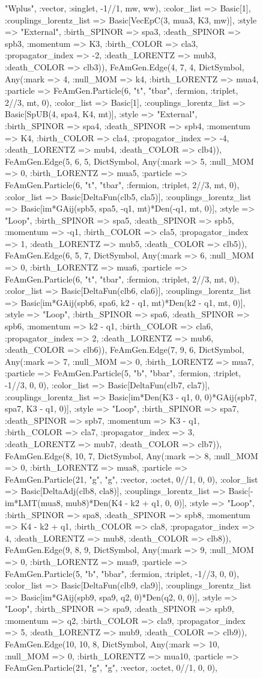 \documentclass{revtex4}
\begin{document}
\begin{figure}[!htb]
\begin{center}
{"Wplus", :vector, :singlet, -1//1, mw, ww), :color_list => Basic[1], :couplings_lorentz_list => Basic[VecEpC(3, mua3, K3, mw)], :style => "External", :birth_SPINOR => spa3, :death_SPINOR => spb3, :momentum => K3, :birth_COLOR => cla3, :propagator_index => -2, :death_LORENTZ => mub3, :death_COLOR => clb3)), FeAmGen.Edge(4, 7, 4, Dict{Symbol, Any}(:mark => 4, :null_MOM => k4, :birth_LORENTZ => mua4, :particle => FeAmGen.Particle(6, "t", "tbar", :fermion, :triplet, 2//3, mt, 0), :color_list => Basic[1], :couplings_lorentz_list => Basic[SpUB(4, spa4, K4, mt)], :style => "External", :birth_SPINOR => spa4, :death_SPINOR => spb4, :momentum => K4, :birth_COLOR => cla4, :propagator_index => -4, :death_LORENTZ => mub4, :death_COLOR => clb4)), FeAmGen.Edge(5, 6, 5, Dict{Symbol, Any}(:mark => 5, :null_MOM => 0, :birth_LORENTZ => mua5, :particle => FeAmGen.Particle(6, "t", "tbar", :fermion, :triplet, 2//3, mt, 0), :color_list => Basic[DeltaFun(clb5, cla5)], :couplings_lorentz_list => Basic[im*GAij(spb5, spa5, -q1, mt)*Den(-q1, mt, 0)], :style => "Loop", :birth_SPINOR => spa5, :death_SPINOR => spb5, :momentum => -q1, :birth_COLOR => cla5, :propagator_index => 1, :death_LORENTZ => mub5, :death_COLOR => clb5)), FeAmGen.Edge(6, 5, 7, Dict{Symbol, Any}(:mark => 6, :null_MOM => 0, :birth_LORENTZ => mua6, :particle => FeAmGen.Particle(6, "t", "tbar", :fermion, :triplet, 2//3, mt, 0), :color_list => Basic[DeltaFun(clb6, cla6)], :couplings_lorentz_list => Basic[im*GAij(spb6, spa6, k2 - q1, mt)*Den(k2 - q1, mt, 0)], :style => "Loop", :birth_SPINOR => spa6, :death_SPINOR => spb6, :momentum => k2 - q1, :birth_COLOR => cla6, :propagator_index => 2, :death_LORENTZ => mub6, :death_COLOR => clb6)), FeAmGen.Edge(7, 9, 6, Dict{Symbol, Any}(:mark => 7, :null_MOM => 0, :birth_LORENTZ => mua7, :particle => FeAmGen.Particle(5, "b", "bbar", :fermion, :triplet, -1//3, 0, 0), :color_list => Basic[DeltaFun(clb7, cla7)], :couplings_lorentz_list => Basic[im*Den(K3 - q1, 0, 0)*GAij(spb7, spa7, K3 - q1, 0)], :style => "Loop", :birth_SPINOR => spa7, :death_SPINOR => spb7, :momentum => K3 - q1, :birth_COLOR => cla7, :propagator_index => 3, :death_LORENTZ => mub7, :death_COLOR => clb7)), FeAmGen.Edge(8, 10, 7, Dict{Symbol, Any}(:mark => 8, :null_MOM => 0, :birth_LORENTZ => mua8, :particle => FeAmGen.Particle(21, "g", "g", :vector, :octet, 0//1, 0, 0), :color_list => Basic[DeltaAdj(clb8, cla8)], :couplings_lorentz_list => Basic[-im*LMT(mua8, mub8)*Den(K4 - k2 + q1, 0, 0)], :style => "Loop", :birth_SPINOR => spa8, :death_SPINOR => spb8, :momentum => K4 - k2 + q1, :birth_COLOR => cla8, :propagator_index => 4, :death_LORENTZ => mub8, :death_COLOR => clb8)), FeAmGen.Edge(9, 8, 9, Dict{Symbol, Any}(:mark => 9, :null_MOM => 0, :birth_LORENTZ => mua9, :particle => FeAmGen.Particle(5, "b", "bbar", :fermion, :triplet, -1//3, 0, 0), :color_list => Basic[DeltaFun(clb9, cla9)], :couplings_lorentz_list => Basic[im*GAij(spb9, spa9, q2, 0)*Den(q2, 0, 0)], :style => "Loop", :birth_SPINOR => spa9, :death_SPINOR => spb9, :momentum => q2, :birth_COLOR => cla9, :propagator_index => 5, :death_LORENTZ => mub9, :death_COLOR => clb9)), FeAmGen.Edge(10, 10, 8, Dict{Symbol, Any}(:mark => 10, :null_MOM => 0, :birth_LORENTZ => mua10, :particle => FeAmGen.Particle(21, "g", "g", :vector, :octet, 0//1, 0, 0), }
\end{center}
\end{figure}
\end{document}
